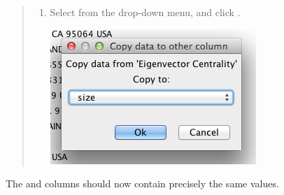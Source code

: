 \documentclass[letterpaper,10pt,english]{sphinxmanual}
\begin{document}
\begin{quote}
\begin{enumerate}
\item {} 
Select  from the drop-down menu, and click .

{\hfill\includegraphics{geo8.png}\hfill}

\end{enumerate}
\end{quote}

The  and  columns should now contain precisely the same
values.
\end{document}
